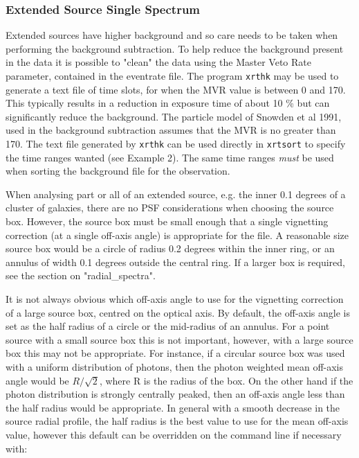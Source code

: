 \documentclass[11pt,fleqn]{article}    %
\begin{document}
\subsubsection{Extended Source Single Spectrum}
Extended sources have higher background and so care needs to be taken
when performing the background subtraction. To help reduce the background
present in the data it is possible to "clean" the data using the Master
Veto Rate parameter, contained in the eventrate file. 
The program {\tt xrthk} may be used to generate a text file of time slots,
for when the MVR value is between 0 and 170. This typically 
results in a reduction in exposure time of about 10 \% but can significantly
reduce the background. The particle model of Snowden et al 1991, used
in the background subtraction assumes that the MVR is no greater than 
170. The text file generated by {\tt xrthk} can be used directly in
{\tt xrtsort}
to specify the time ranges wanted (see Example 2). The same time ranges
{\em must} be used when sorting the background file for the observation.

When analysing part or all of an extended source, e.g. the inner 0.1
degrees of a cluster of galaxies, there are no PSF considerations
when choosing the source box. 
However, the source box must be small enough that a single
vignetting correction (at a single off-axis angle) is appropriate for
the file. A reasonable size source box would be a circle of radius 
0.2 degrees within the inner ring, or an annulus of width 0.1 degrees 
outside the central ring. If a larger box is required, see the 
section on "radial\_spectra".

It is not always obvious which off-axis angle to use for the vignetting
correction of a large source box, centred on the optical axis. 
By default, the off-axis angle is set
as the half radius of a circle or the mid-radius of an annulus. For a point
source with a small source box this is not important, however, with a
large source box this may not be appropriate. For instance, if a circular 
source box was used with a uniform distribution of photons, then the
photon weighted mean off-axis angle would be $R / \sqrt{2}$, where R is
the radius of the box. On the other hand if the photon distribution is
strongly centrally peaked, then an off-axis angle less than the half
radius would be appropriate. In general with a smooth decrease in the
source radial profile, the half radius is the best value to use for the
mean off-axis value, however this default can be overridden on the 
command line if necessary with:
\end{document}
